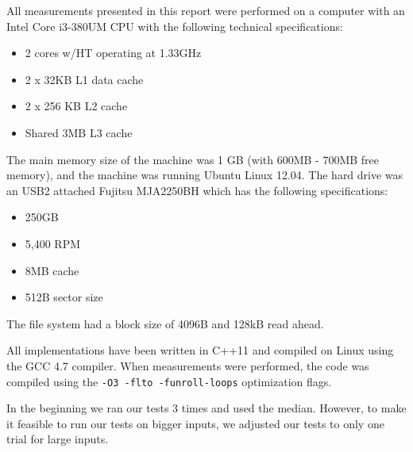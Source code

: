 All measurements presented in this report were performed on a computer
with an Intel Core i3-380UM CPU with the following technical
specifications:
\begin{itemize}
\item 2 cores w/HT operating at 1.33GHz
\item 2 x 32KB L1 data cache
\item 2 x 256 KB L2 cache
\item Shared 3MB L3 cache
\end{itemize}
The main memory size of the machine was 1 GB (with 600MB - 700MB free memory), and the machine was running Ubuntu
Linux 12.04. The hard drive was an USB2 attached Fujitsu MJA2250BH which has the following specifications:

\begin{itemize}
\item 250GB
\item 5,400 RPM
\item 8MB cache
\item 512B sector size
\end{itemize}

The file system had a block size of 4096B and 128kB read ahead.

All implementations have been
written in C++11 and compiled on Linux using the GCC 4.7 compiler. When measurements were performed, the
code was compiled using the \texttt{-O3 -flto -funroll-loops}
optimization flags.

In the beginning we ran our tests 3 times and used the median. However, to make it feasible
to run our tests on bigger inputs, we adjusted our tests to only
one trial for large inputs.